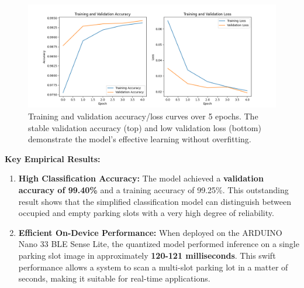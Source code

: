 \documentclass[sigconf,10pt,nonacm]{acmart}
\begin{document}
\begin{figure}[h!]
  \centering
  \includegraphics[width=\linewidth]{./images/training_results.png}
  \caption{Training and validation accuracy/loss curves over 5 epochs. The stable validation accuracy (top) and low validation loss (bottom) demonstrate the model's effective learning without overfitting.}
  \label{fig:training_results}
\end{figure}

\noindent\textbf{Key Empirical Results:}
\begin{enumerate}
    \item \textbf{High Classification Accuracy:} The model achieved a \textbf{validation accuracy of 99.40\%} and a training accuracy of 99.25\%. This outstanding result shows that the simplified classification model can distinguish between occupied and empty parking slots with a very high degree of reliability.
    \item \textbf{Efficient On-Device Performance:} When deployed on the ARDUINO Nano 33 BLE Sense Lite, the quantized model performed inference on a single parking slot image in approximately \textbf{120-121 milliseconds}. This swift performance allows a system to scan a multi-slot parking lot in a matter of seconds, making it suitable for real-time applications.
\end{enumerate}
\end{document}

